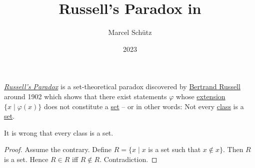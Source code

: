 \documentclass[english]{article}
\begin{document}
\title{Russell's Paradox in \Naproche}
\author{Marcel Schütz}
\date{2023}
\maketitle

\noindent \href{https://en.wikipedia.org/wiki/Russell%27s_paradox}{\emph{Russell's Paradox}} is a set-theoretical paradox discovered by \href{https://en.wikipedia.org/wiki/Bertrand_Russell}{Bertrand Russell} around 1902 \cite[chapter XV]{Frege1980} which shows that there exist statements $\varphi$ whose \href{https://en.wikipedia.org/wiki/Extension_(semantics)}{extension} $\{ x \mid \varphi(x) \}$ does not constitute a \href{https://en.wikipedia.org/wiki/Set_(mathematics)}{set} – or in other words: Not every \href{https://en.wikipedia.org/wiki/Class_(set_theory)}{class} is a \href{https://en.wikipedia.org/wiki/Set_(mathematics)}{set}.

\begin{forthel}

  \begin{theorem*}\label{russell_paradox}
    It is wrong that every class is a set.
  \end{theorem*}
  \begin{proof}
    Assume the contrary.
    Define $R = \{ x \mid x$ is a set such that $x \notin x \}$.
    Then $R$ is a set.
    Hence $R \in R$ iff $R \notin R$.
    Contradiction.
  \end{proof}
\end{forthel}

\printbibliography
\vfill
\doclicenseThis
\end{document}

